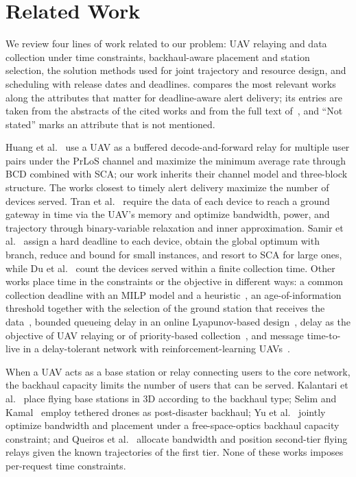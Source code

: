 \section{Related Work}
\label{sec:related}

We review four lines of work related to our problem: UAV relaying and data collection under time constraints, backhaul-aware placement and station selection, the solution methods used for joint trajectory and resource design, and scheduling with release dates and deadlines.  compares the most relevant works along the attributes that matter for deadline-aware alert delivery; its entries are taken from the abstracts of the cited works and from the full text of~\cite{huang2025ddatsap}, and ``Not stated'' marks an attribute that is not mentioned.



Huang et al.~\cite{huang2025ddatsap} use a UAV as a buffered decode-and-forward relay for multiple user pairs under the PrLoS channel and maximize the minimum average rate through BCD combined with SCA; our work inherits their channel model and three-block structure. The works closest to timely alert delivery maximize the number of devices served. Tran et al.~\cite{tran2022relay} require the data of each device to reach a ground gateway in time via the UAV's memory and optimize bandwidth, power, and trajectory through binary-variable relaxation and inner approximation. Samir et al.~\cite{samir2020time} assign a hard deadline to each device, obtain the global optimum with branch, reduce and bound for small instances, and resort to SCA for large ones, while Du et al.~\cite{du2023timeconstrained} count the devices served within a finite collection time. Other works place time in the constraints or the objective in different ways: a common collection deadline with an MILP model and a heuristic~\cite{albusalih2018deadline}, an age-of-information threshold together with the selection of the ground station that receives the data~\cite{liu2022aoi,liu2024interference}, bounded queueing delay in an online Lyapunov-based design~\cite{tang2022delay}, delay as the objective of UAV relaying or of priority-based collection~\cite{he2022delay,cao2023priority,fadlullah2016dynamic}, and message time-to-live in a delay-tolerant network with reinforcement-learning UAVs~\cite{wang2026juror}.

When a UAV acts as a base station or relay connecting users to the core network, the backhaul capacity limits the number of users that can be served. Kalantari et al.~\cite{kalantari2017backhaul} place flying base stations in 3D according to the backhaul type; Selim and Kamal~\cite{selim2018postdisaster} employ tethered drones as post-disaster backhaul; Yu et al.~\cite{yu2023backhaul} jointly optimize bandwidth and placement under a free-space-optics backhaul capacity constraint; and Queiros et al.~\cite{queiros2024predictive} allocate bandwidth and position second-tier flying relays given the known trajectories of the first tier. None of these works imposes per-request time constraints.

